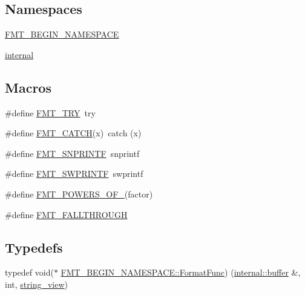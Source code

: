 \subsection*{Namespaces}
\begin{DoxyCompactItemize}
\item 
 \hyperlink{namespace_f_m_t___b_e_g_i_n___n_a_m_e_s_p_a_c_e}{F\+M\+T\+\_\+\+B\+E\+G\+I\+N\+\_\+\+N\+A\+M\+E\+S\+P\+A\+CE}
\item 
 \hyperlink{namespaceinternal}{internal}
\end{DoxyCompactItemize}
\subsection*{Macros}
\begin{DoxyCompactItemize}
\item 
\#define \hyperlink{format-inl_8h_a4aa79926398ee27fe7d6db8b0dd54edf}{F\+M\+T\+\_\+\+T\+RY}~try
\item 
\#define \hyperlink{format-inl_8h_ab8efe0100a6d7cc74729f5bf7537799c}{F\+M\+T\+\_\+\+C\+A\+T\+CH}(x)~catch (x)
\item 
\#define \hyperlink{format-inl_8h_a9a9bb3caa94066b3adc175bb24cb1783}{F\+M\+T\+\_\+\+S\+N\+P\+R\+I\+N\+TF}~snprintf
\item 
\#define \hyperlink{format-inl_8h_a7b59f9b149f610d3edd05ed99536253c}{F\+M\+T\+\_\+\+S\+W\+P\+R\+I\+N\+TF}~swprintf
\item 
\#define \hyperlink{format-inl_8h_aeff75c93a29bc942ca36b31a4b634fe9}{F\+M\+T\+\_\+\+P\+O\+W\+E\+R\+S\+\_\+\+O\+F\+\_}(factor)
\item 
\#define \hyperlink{format-inl_8h_a35d4bc2bf717ac7731de7713c54175bb}{F\+M\+T\+\_\+\+F\+A\+L\+L\+T\+H\+R\+O\+U\+GH}
\end{DoxyCompactItemize}
\subsection*{Typedefs}
\begin{DoxyCompactItemize}
\item 
typedef void($\ast$ \hyperlink{namespace_f_m_t___b_e_g_i_n___n_a_m_e_s_p_a_c_e_a6da944ca5d9656fe12a5c1f629f665ff}{F\+M\+T\+\_\+\+B\+E\+G\+I\+N\+\_\+\+N\+A\+M\+E\+S\+P\+A\+C\+E\+::\+Format\+Func}) (\hyperlink{namespaceinternal_a5fcdbc3efad1f390e6c3f0fdafa56122}{internal\+::buffer} \&, int, \hyperlink{core_8h_a17e3ff7f9ac2b8f068f719b829890036}{string\+\_\+view})
\end{DoxyCompactItemize}
